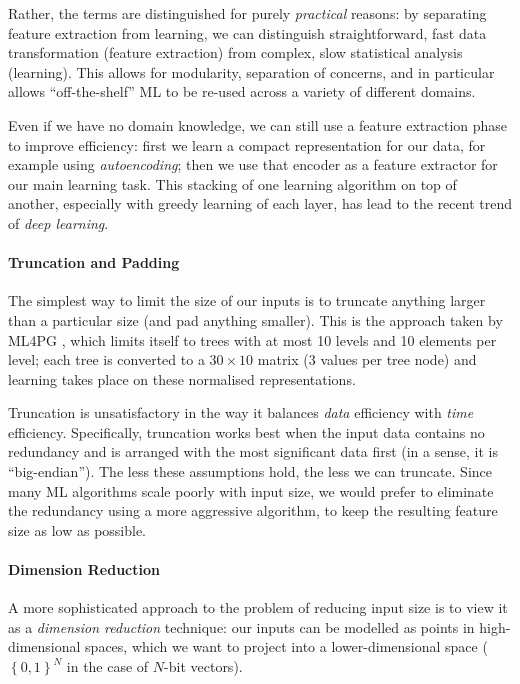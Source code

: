 Rather, the terms are distinguished for purely \emph{practical} reasons: by
separating feature extraction from learning, we can distinguish straightforward,
fast data transformation (feature extraction) from complex, slow statistical
analysis (learning). This allows for modularity, separation of concerns, and in
particular allows ``off-the-shelf'' ML to be re-used across a variety of
different domains.

Even if we have no domain knowledge, we can still use a feature extraction phase
to improve efficiency: first we learn a compact representation for our data, for
example using \emph{autoencoding}; then we use that encoder as a feature
extractor for our main learning task. This stacking of one learning algorithm on
top of another, especially with greedy learning of each layer, has lead to the
recent trend of \emph{deep learning}.

\paragraph{Truncation and Padding}

The simplest way to limit the size of our inputs is to truncate anything larger
than a particular size (and pad anything smaller). This is the approach taken by
ML4PG \cite{journals/corr/abs-1302-6421}, which limits itself to trees with at
most 10 levels and 10 elements per level; each tree is converted to a
$30 \times 10$ matrix (3 values per tree node) and learning takes place on these
normalised representations.

Truncation is unsatisfactory in the way it balances \emph{data} efficiency with
\emph{time} efficiency. Specifically, truncation works best when the input data
contains no redundancy and is arranged with the most significant data first (in
a sense, it is ``big-endian''). The less these assumptions hold, the less we can
truncate. Since many ML algorithms scale poorly with input size, we would prefer
to eliminate the redundancy using a more aggressive algorithm, to keep the
resulting feature size as low as possible.

\paragraph{Dimension Reduction}

A more sophisticated approach to the problem of reducing input size is to view
it as a \emph{dimension reduction} technique: our inputs can be modelled as
points in high-dimensional spaces, which we want to project into a
lower-dimensional space ($\left\{ {0, 1} \right\}^N$ in the case of $N$-bit
vectors).


